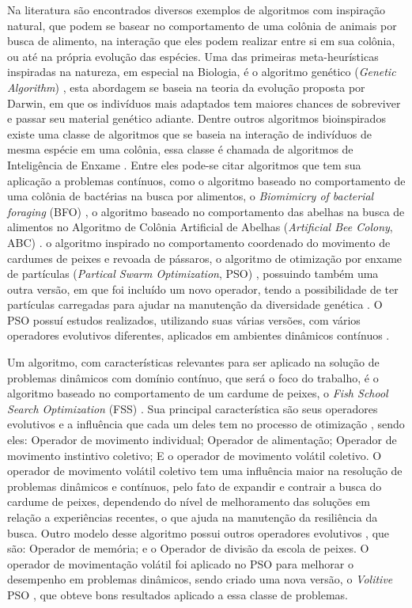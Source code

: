 Na literatura são encontrados diversos exemplos de algoritmos com inspiração natural, que podem se basear no comportamento de uma colônia de animais por busca de alimento, na interação que eles podem realizar entre si em sua colônia, ou até na própria evolução das espécies. Uma das primeiras meta-heurísticas inspiradas na natureza, em especial na Biologia, é o algoritmo genético (\textit{Genetic Algorithm}) \cite{holland1975adaptation}, esta abordagem se baseia na teoria da evolução proposta por Darwin, em que os indivíduos mais adaptados tem maiores chances de sobreviver e passar seu material genético adiante. Dentre outros algoritmos bioinspirados existe uma classe de algoritmos que se baseia na interação de indivíduos de mesma espécie em uma colônia, essa classe é chamada de algoritmos de Inteligência de Enxame \cite{parpinelli2011new}. Entre eles pode-se citar algoritmos que tem sua aplicação a problemas contínuos, como o algoritmo baseado no comportamento de uma colônia de bactérias na busca por alimentos, o \textit{Biomimicry of bacterial foraging} (BFO) \cite{passino2002biomimicry}, o algoritmo baseado no comportamento das abelhas na busca de alimentos no Algoritmo de Colônia Artificial de Abelhas (\textit{Artificial Bee Colony}, ABC) \cite{abc}. o algoritmo inspirado no comportamento coordenado do movimento de cardumes de peixes e revoada de pássaros, o algoritmo de otimização por enxame de partículas (\textit{Partical Swarm Optimization}, PSO) \cite{pso}, possuindo também uma outra versão, em que foi incluído um novo operador, tendo a possibilidade de ter partículas carregadas para ajudar na manutenção da diversidade genética \cite{modified_pso}. O PSO possuí estudos realizados, utilizando suas várias versões, com vários operadores evolutivos diferentes, aplicados em ambientes dinâmicos contínuos \cite{carlisle2002applying}.

Um algoritmo, com características relevantes para ser aplicado na solução de problemas dinâmicos com domínio contínuo, que será o foco do trabalho, é o algoritmo baseado no comportamento de um cardume de peixes, o \textit{Fish School Search Optimization} (FSS) \cite{carmelo2008novel}. Sua principal característica são seus operadores evolutivos e a influência que cada um deles tem no processo de otimização \cite{c2009influence}, sendo eles: Operador de movimento individual; Operador de alimentação; Operador de movimento instintivo coletivo; E o operador de movimento volátil coletivo. O operador de movimento volátil coletivo tem uma influência maior na resolução de problemas dinâmicos e contínuos, pelo fato de expandir e contrair a busca do cardume de peixes, dependendo do nível de melhoramento das soluções em relação a experiências recentes, o que ajuda na manutenção da resiliência da busca. Outro modelo desse algoritmo possui outros operadores evolutivos \cite{madeiro2011density}, que são: Operador de memória; e o Operador de divisão da escola de peixes. O operador de movimentação volátil foi aplicado no PSO para melhorar o desempenho em problemas dinâmicos, sendo criado uma nova versão, o \textit{Volitive} PSO \cite{cavalcanti2011hybrid}, que obteve bons resultados aplicado a essa classe de problemas.


